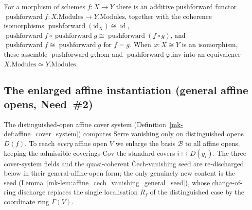 \begin{lemma}
  \label{mk-lem:modules_pushforward_mathlib}
  \mathlibok

  For a morphism of schemes \(f : X \to Y\) there is an additive pushforward functor
  \(\operatorname{pushforward} f : X.\mathrm{Modules} \to Y.\mathrm{Modules}\), together with the
  coherence isomorphisms \(\operatorname{pushforward}(\mathrm{id}_X) \cong \operatorname{id}\),
  \(\operatorname{pushforward} f \circ \operatorname{pushforward} g \cong
  \operatorname{pushforward}(f \circ g)\), and \(\operatorname{pushforward} f \cong
  \operatorname{pushforward} g\) for \(f = g\). When \(\varphi : X \cong Y\) is an isomorphism, these
  assemble \(\operatorname{pushforward}\varphi.\mathrm{hom}\) and
  \(\operatorname{pushforward}\varphi.\mathrm{inv}\) into an equivalence
  \(X.\mathrm{Modules} \simeq Y.\mathrm{Modules}\).
\end{lemma}

\subsection{The enlarged affine instantiation (general affine opens, Need~\#2)}

The distinguished-open affine cover system (Definition~\ref{mk-def:affine_cover_system}) computes Serre
vanishing only on distinguished opens \(D(f)\). To reach \emph{every} affine open \(V\) we enlarge the
basis \(\mathcal{B}\) to all affine opens, keeping the admissible coverings \(\mathrm{Cov}\) the standard
covers \(i \mapsto D(g_i)\). The three cover-system fields and the quasi-coherent {\v C}ech-vanishing seed
are re-discharged below in their general-affine-open form; the only genuinely new content is the seed
(Lemma~\ref{mk-lem:affine_cech_vanishing_general_seed}), whose change-of-ring discharge replaces the single
localisation \(R_f\) of the distinguished case by the coordinate ring \(\Gamma(V)\).

